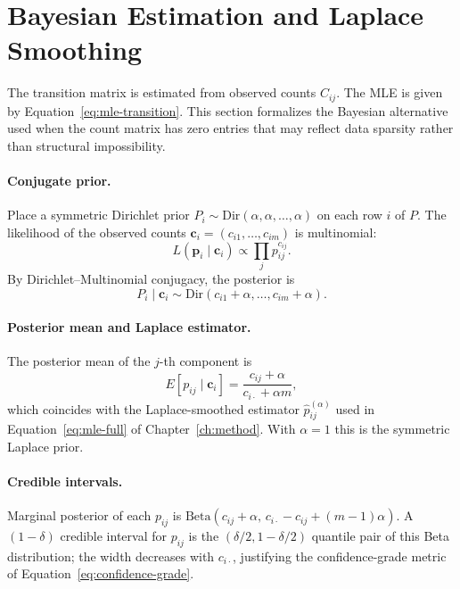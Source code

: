 \section{Bayesian Estimation and Laplace Smoothing}
\label{app:A-bayes}

The transition matrix is estimated from observed counts $C_{ij}$. The MLE
is given by Equation~\ref{eq:mle-transition}. This section formalizes the
Bayesian alternative used when the count matrix has zero entries that may
reflect data sparsity rather than structural impossibility.

\paragraph{Conjugate prior.} Place a symmetric Dirichlet prior
$P_i \sim \mathrm{Dir}(\alpha, \alpha, \ldots, \alpha)$ on each row $i$ of
$P$. The likelihood of the observed counts $\mathbf{c}_i = (c_{i1},
\ldots, c_{im})$ is multinomial:
\begin{equation}
L(\mathbf{p}_i \mid \mathbf{c}_i) \propto \prod_{j} p_{ij}^{c_{ij}}.
\end{equation}
By Dirichlet–Multinomial conjugacy, the posterior is
\begin{equation}
P_i \mid \mathbf{c}_i \sim
\mathrm{Dir}(c_{i1} + \alpha, \ldots, c_{im} + \alpha).
\end{equation}

\paragraph{Posterior mean and Laplace estimator.} The posterior mean of
the $j$-th component is
\begin{equation}
\label{eq:A-laplace}
E[p_{ij} \mid \mathbf{c}_i]
= \frac{c_{ij} + \alpha}{c_{i\cdot} + \alpha m},
\end{equation}
which coincides with the Laplace-smoothed estimator
$\hat{p}_{ij}^{(\alpha)}$ used in
Equation~\ref{eq:mle-full} of Chapter~\ref{ch:method}. With $\alpha = 1$
this is the symmetric Laplace prior.

\paragraph{Credible intervals.} Marginal posterior of each $p_{ij}$ is
$\mathrm{Beta}(c_{ij} + \alpha,\, c_{i\cdot} - c_{ij} + (m-1)\alpha)$.
A $(1-\delta)$ credible interval for $p_{ij}$ is the
$(\delta/2, 1-\delta/2)$ quantile pair of this Beta distribution; the
width decreases with $c_{i\cdot}$, justifying the confidence-grade metric
of Equation~\ref{eq:confidence-grade}.


